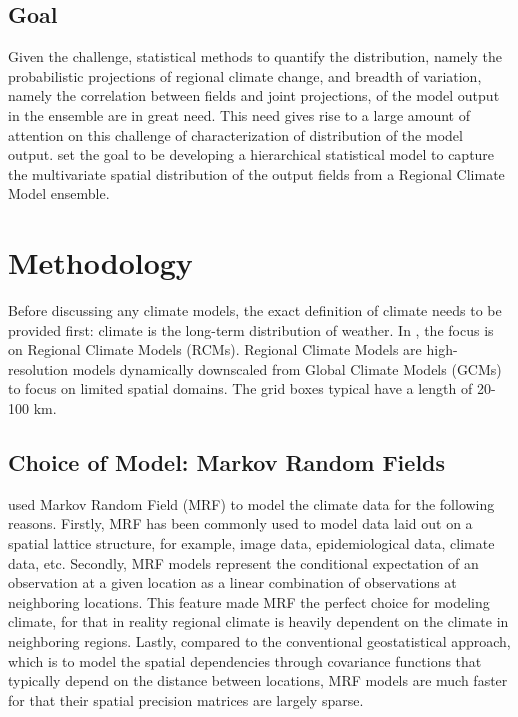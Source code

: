 \documentclass{article}
\begin{document}
\subsection{Goal}
Given the challenge, statistical methods to quantify the distribution, namely the probabilistic projections of regional climate change, and breadth of variation, namely the correlation between fields and joint projections, of the model output in the ensemble are in great need. This need gives rise to a large amount of attention on this challenge of characterization of distribution of the model output. \cite{paper} set the goal to be developing a hierarchical statistical model to capture the multivariate spatial distribution of the output fields from a Regional Climate Model ensemble. 

\section{Methodology}
Before discussing any climate models, the exact definition of climate needs to be provided first: climate is the long-term distribution of weather. In \cite{paper}, the focus is on Regional Climate Models (RCMs). Regional Climate Models are high-resolution models dynamically downscaled from Global Climate Models (GCMs) to focus on limited spatial domains. The grid boxes typical have a length of 20-100 km. 

\subsection{Choice of Model: Markov Random Fields}
\cite{paper} used Markov Random Field (MRF) to model the climate data for the following reasons. Firstly, MRF has been commonly used to model data laid out on a spatial lattice structure, for example, image data, epidemiological data, climate data, etc. Secondly, MRF models represent the conditional expectation of an observation at a given location as a linear combination of observations at neighboring locations. This feature made MRF the perfect choice for modeling climate, for that in reality regional climate is heavily dependent on the climate in neighboring regions. Lastly, compared to the conventional geostatistical approach, which is to model the spatial dependencies through covariance functions that typically depend on the distance between locations, MRF models are much faster for that their spatial precision matrices are largely sparse.
\end{document}
